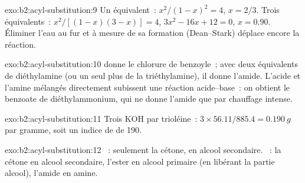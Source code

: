 \begin{solution}{exo:b2:acyl-substitution:9}
Un équivalent~: $x^2/(1 - x)^2 = 4$, $x = 2/3$. Trois équivalents~: $x^2/[(1 - x)(3 - x)] = 4$, $3x^2 - 16x
+ 12 = 0$, $x = 0.90$. Éliminer l'eau au fur et à mesure de sa formation (Dean--Stark) déplace encore la réaction.
\end{solution}

\begin{solution}{exo:b2:acyl-substitution:10}
 donne le chlorure de benzoyle~; avec deux équivalents de diéthylamine (ou un seul plus
de la triéthylamine), il donne l'amide. L'acide et l'amine mélangés directement subissent une réaction
acide--base~: on obtient le benzoate de diéthylammonium, qui ne donne l'amide que par chauffage intense.
\end{solution}

\begin{solution}{exo:b2:acyl-substitution:11}
Trois KOH par trioléine~: $3 \times 56.11/885.4 = \qty{0.190}{g}$ par gramme, soit un indice de
 de 190.
\end{solution}

\begin{solution}{exo:b2:acyl-substitution:12}
~: seulement la cétone, en alcool secondaire. ~: la cétone en alcool secondaire,
l'ester en alcool primaire (en libérant la partie alcool), l'amide en amine.
\end{solution}

